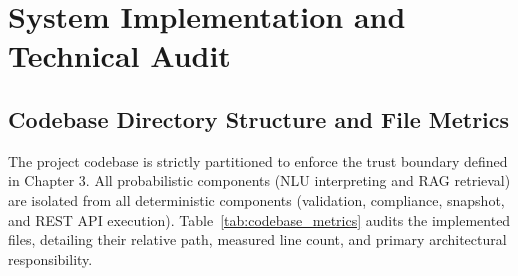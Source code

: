 \section{System Implementation and Technical Audit}
\label{sec:implementation}

\subsection{Codebase Directory Structure and File Metrics}
\label{subsec:metrics}

The project codebase is strictly partitioned to enforce the trust boundary defined in Chapter 3. All probabilistic components (NLU interpreting and RAG retrieval) are isolated from all deterministic components (validation, compliance, snapshot, and REST API execution). Table~\ref{tab:codebase_metrics} audits the implemented files, detailing their relative path, measured line count, and primary architectural responsibility.

